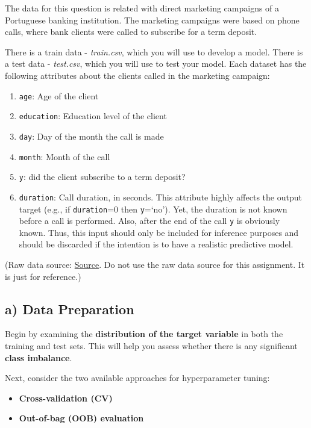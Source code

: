 \documentclass[
  letterpaper,
  DIV=11,
  numbers=noendperiod]{scrreprt}
\providecommand{\tightlist}{%
  \setlength{\itemsep}{0pt}\setlength{\parskip}{0pt}}\usepackage{longtable,booktabs,array}
\begin{document}
The data for this question is related with direct marketing campaigns of
a Portuguese banking institution. The marketing campaigns were based on
phone calls, where bank clients were called to subscribe for a term
deposit.

There is a train data - \emph{train.csv}, which you will use to develop
a model. There is a test data - \emph{test.csv}, which you will use to
test your model. Each dataset has the following attributes about the
clients called in the marketing campaign:

\begin{enumerate}
\def\labelenumi{\arabic{enumi}.}
\item
  \texttt{age}: Age of the client
\item
  \texttt{education}: Education level of the client
\item
  \texttt{day}: Day of the month the call is made
\item
  \texttt{month}: Month of the call
\item
  \texttt{y}: did the client subscribe to a term deposit?
\item
  \texttt{duration}: Call duration, in seconds. This attribute highly
  affects the output target (e.g., if \texttt{duration}=0 then
  \texttt{y}=`no'). Yet, the duration is not known before a call is
  performed. Also, after the end of the call \texttt{y} is obviously
  known. Thus, this input should only be included for inference purposes
  and should be discarded if the intention is to have a realistic
  predictive model.
\end{enumerate}

(Raw data source:
\href{https://archive.ics.uci.edu/ml/datasets/bank+marketing}{Source}.
Do not use the raw data source for this assignment. It is just for
reference.)

\subsection{a) Data Preparation}\label{a-data-preparation-1}

Begin by examining the \textbf{distribution of the target variable} in
both the training and test sets. This will help you assess whether there
is any significant \textbf{class imbalance}.

Next, consider the two available approaches for hyperparameter tuning:

\begin{itemize}
\tightlist
\item
  \textbf{Cross-validation (CV)}
\item
  \textbf{Out-of-bag (OOB) evaluation}
\end{itemize}
\end{document}
